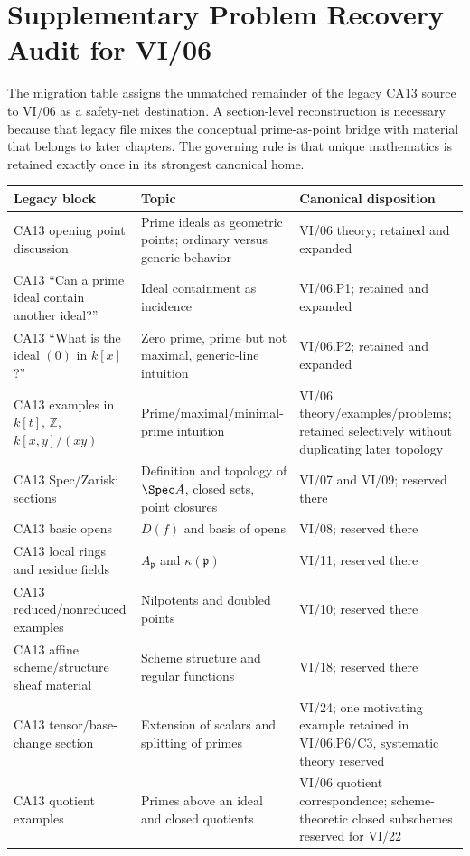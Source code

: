 \chapter*{Supplementary Problem Recovery Audit for VI/06}

The migration table assigns the unmatched remainder of the legacy CA13 source to VI/06 as a safety-net destination.  A
section-level reconstruction is necessary because that legacy file mixes the conceptual
prime-as-point bridge with material that belongs to later chapters.  The governing rule is
that unique mathematics is retained exactly once in its strongest canonical home.

\begin{longtable}{>{\raggedright\arraybackslash}p{}>{\raggedright\arraybackslash}p{}>{\raggedright\arraybackslash}p{}}
\toprule
\textbf{Legacy block} & \textbf{Topic} & \textbf{Canonical disposition}\\
\midrule
CA13 opening point discussion & Prime ideals as geometric points; ordinary versus generic behavior & VI/06 theory; retained and expanded\\
CA13 ``Can a prime ideal contain another ideal?'' & Ideal containment as incidence & VI/06.P1; retained and expanded\\
CA13 ``What is the ideal $(0)$ in $k[x]$?'' & Zero prime, prime but not maximal, generic-line intuition & VI/06.P2; retained and expanded\\
CA13 examples in $k[t]$, $\mathbb Z$, $k[x,y]/(xy)$ & Prime/maximal/minimal-prime intuition & VI/06 theory/examples/problems; retained selectively without duplicating later topology\\
CA13 Spec/Zariski sections & Definition and topology of $\Spec A$, closed sets, point closures & VI/07 and VI/09; reserved there\\
CA13 basic opens & $D(f)$ and basis of opens & VI/08; reserved there\\
CA13 local rings and residue fields & $A_{\mathfrak p}$ and $\kappa(\mathfrak p)$ & VI/11; reserved there\\
CA13 reduced/nonreduced examples & Nilpotents and doubled points & VI/10; reserved there\\
CA13 affine scheme/structure sheaf material & Scheme structure and regular functions & VI/18; reserved there\\
CA13 tensor/base-change section & Extension of scalars and splitting of primes & VI/24; one motivating example retained in VI/06.P6/C3, systematic theory reserved\\
CA13 quotient examples & Primes above an ideal and closed quotients & VI/06 quotient correspondence; scheme-theoretic closed subschemes reserved for VI/22\\
\bottomrule
\end{longtable}

